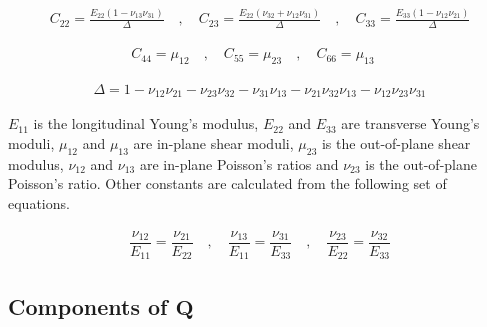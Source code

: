 \begin{equation*}
\begin{matrix}
    C_{22} = \displaystyle\frac{E_{22} (1 - \nu_{13} \nu_{31})}{\Delta} \quad , \quad
    C_{23} = \displaystyle\frac{E_{22} (\nu_{32} + \nu_{12} \nu_{31})}{\Delta} \quad, \quad
    C_{33} = \displaystyle\frac{E_{33} (1 - \nu_{12} \nu_{21})}{\Delta}
\end{matrix}
\end{equation*}

\begin{equation}
\begin{matrix}
    C_{44} = \mu_{12} \quad, \quad
    C_{55} = \mu_{23} \quad, \quad
    C_{66} = \mu_{13} \quad
\end{matrix}
\end{equation}

\begin{equation}
\begin{matrix}
    \Delta = 1 - \nu_{12} \nu_{21} - \nu_{23} \nu_{32} - \nu_{31} \nu_{13} - \nu_{21} \nu_{32} \nu_{13} - \nu_{12} \nu_{23} \nu_{31}
\end{matrix}
\label{eq:C_components}
\end{equation}

$E_{11}$ is the longitudinal Young's modulus, $E_{22}$ and $E_{33}$ are transverse Young's moduli, $\mu_{12}$ and $\mu_{13}$ are in-plane shear moduli, $\mu_{23}$ is the out-of-plane shear modulus, $\nu_{12}$ and $\nu_{13}$ are in-plane Poisson's ratios and $\nu_{23}$ is the out-of-plane Poisson's ratio. Other constants are calculated from the following set of equations.

\begin{equation}
\begin{matrix}
    \dfrac{\nu_{12}}{E_{11}} = \dfrac{\nu_{21}}{E_{22}} \quad , \quad
    \dfrac{\nu_{13}}{E_{11}} = \dfrac{\nu_{31}}{E_{33}} \quad , \quad
    \dfrac{\nu_{23}}{E_{22}} = \dfrac{\nu_{32}}{E_{33}}
\end{matrix}
\label{eq:nu_componenst}
\end{equation}

\subsection{Components of \texorpdfstring{$\boldsymbol{Q}$}{}}

